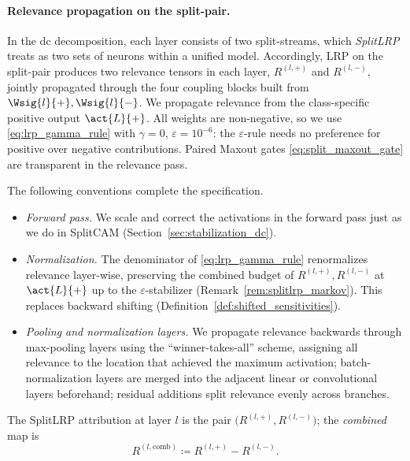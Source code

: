 \paragraph{Relevance propagation on the split-pair.}\label{subsec:splitlrp_definition}
In the \ac{dc} decomposition, each layer consists of two split-streams, which \emph{SplitLRP} treats as two sets of neurons within a unified model. Accordingly, LRP on the split-pair produces two relevance tensors in each layer, $R^{(l,+)}$ and $R^{(l,-)}$, jointly propagated through the four coupling blocks built from $\Wsig{l}{+},\Wsig{l}{-}$. We propagate relevance from the class-specific positive output $\act{L}{+}$. All weights are non-negative, so we use \eqref{eq:lrp_gamma_rule} with $\gamma=0$, $\varepsilon=10^{-6}$: the $\varepsilon$-rule needs no preference for positive over negative contributions. Paired Maxout gates \eqref{eq:split_maxout_gate} are transparent in the relevance pass.

The following conventions complete the specification.
\begin{itemize}
	\item \emph{Forward pass.} We scale and correct the activations in the forward pass just as we do in SplitCAM (Section~\ref{sec:stabilization_dc}).
	\item \emph{Normalization.} The denominator of \eqref{eq:lrp_gamma_rule} renormalizes relevance layer-wise, preserving the combined budget of $R^{(l,+)},R^{(l,-)}$ at $\act{L}{+}$ up to the $\varepsilon$-stabilizer (Remark~\ref{rem:splitlrp_markov}). This replaces backward shifting (Definition~\ref{def:shifted_sensitivities}).
	\item \emph{Pooling and normalization layers.} We propagate relevance backwards through max-pooling layers using the ``winner-takes-all'' scheme, assigning all relevance to the location that achieved the maximum activation; batch-nor\-mal\-iza\-tion layers are merged into the adjacent linear or convolutional layers beforehand; residual additions split relevance evenly across branches.
\end{itemize}

\begin{definition}\label{def:splitlrp_combined}
The SplitLRP attribution at layer $l$ is the pair $\bigl(R^{(l,+)}, R^{(l,-)}\bigr)$; the \emph{combined} map is
\begin{equation}
	R^{(l, \mathrm{comb})} \coloneqq R^{(l, +)} - R^{(l, -)}.
	\label{eq:splitlrp_combined}
\end{equation}
\end{definition}

